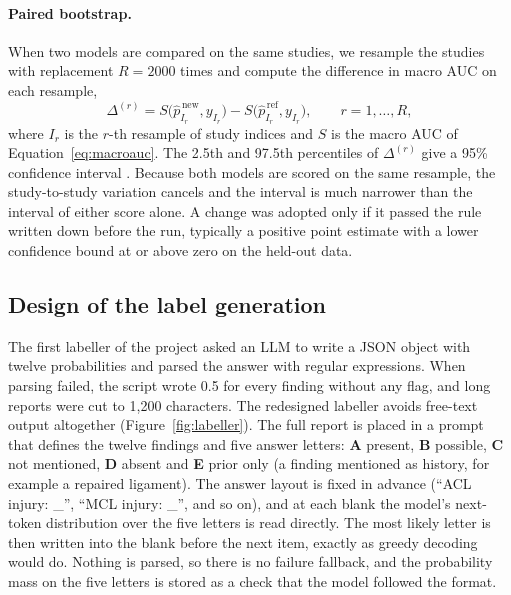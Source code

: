 \paragraph{Paired bootstrap.} When two models are compared on the same studies, we resample the studies with replacement $R=2000$ times and compute the difference in macro AUC on each resample,
\begin{equation}
\Delta^{(r)} = S\big(\hat p^{\,\text{new}}_{I_r}, y_{I_r}\big) - S\big(\hat p^{\,\text{ref}}_{I_r}, y_{I_r}\big), \qquad r = 1,\dots,R,
\label{eq:bootstrap}
\end{equation}
where $I_r$ is the $r$-th resample of study indices and $S$ is the macro AUC of Equation~\eqref{eq:macroauc}. The 2.5th and 97.5th percentiles of $\Delta^{(r)}$ give a 95\% confidence interval \cite{efron1993}. Because both models are scored on the same resample, the study-to-study variation cancels and the interval is much narrower than the interval of either score alone. A change was adopted only if it passed the rule written down before the run, typically a positive point estimate with a lower confidence bound at or above zero on the held-out data.

\subsection{Design of the label generation}
\label{sec:design-labels}

The first labeller of the project asked an LLM to write a JSON object with twelve probabilities and parsed the answer with regular expressions. When parsing failed, the script wrote 0.5 for every finding without any flag, and long reports were cut to 1,200 characters. The redesigned labeller avoids free-text output altogether (Figure~\ref{fig:labeller}). The full report is placed in a prompt that defines the twelve findings and five answer letters: \textbf{A} present, \textbf{B} possible, \textbf{C} not mentioned, \textbf{D} absent and \textbf{E} prior only (a finding mentioned as history, for example a repaired ligament). The answer layout is fixed in advance (``ACL injury: \_'', ``MCL injury: \_'', and so on), and at each blank the model's next-token distribution over the five letters is read directly. The most likely letter is then written into the blank before the next item, exactly as greedy decoding would do. Nothing is parsed, so there is no failure fallback, and the probability mass on the five letters is stored as a check that the model followed the format.


